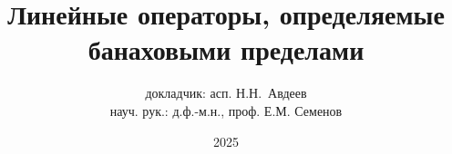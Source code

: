 

\title{
	Линейные операторы, определяемые банаховыми пределами
}
\author{докладчик: асп. Н.Н.~Авдеев\\науч. рук.: д.ф.-м.н., проф. Е.М. Семенов}
\date{2025}

\maketitle
